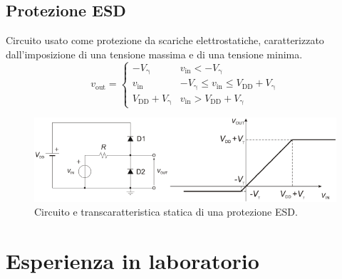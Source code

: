 \documentclass[a4paper]{article}
\begin{document}
{{		\subsection{Protezione ESD}
			Circuito usato come protezione da scariche elettrostatiche, caratterizzato dall'imposizione di una tensione massima e di una tensione minima.
			\begin{equation*}
				v_{\mathrm{out}} =
				\begin{cases}
					-V_{\mathrm{\gamma}}				  & v_{\mathrm{in}} < -V_{\mathrm{\gamma}} \\
					v_{\mathrm{in}} 				 	  & -V_{\mathrm{\gamma}} \le v_{\mathrm{in}} \le V_{\mathrm{DD}} + V_{\mathrm{\gamma}} \\
					V_{\mathrm{DD}} + V_{\mathrm{\gamma}} & v_{\mathrm{in}} > V_{\mathrm{DD}} + V_{\mathrm{\gamma}}
				\end{cases}
			\end{equation*}
			\begin{figure}[h!]
				\centering
				\includegraphics[scale=0.7]{transcaratteristicaStaticaProtezioneESD}
				\caption{Circuito e transcaratteristica statica di una protezione ESD.}
				\label{fig:transcaratteristicaStaticaProtezioneESD}
			\end{figure}
	\section{Esperienza in laboratorio}
}}
\end{document}
